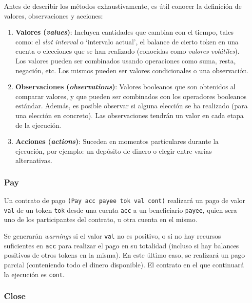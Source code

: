 \documentclass[12pt]{book}
\begin{document}
Antes de describir los métodos exhaustivamente, es útil conocer la definición de valores, observaciones y acciones:

\begin{enumerate}
    \item \textbf{Valores (\textit{values})}: Incluyen cantidades que cambian con el tiempo, tales como: el \textit{slot interval} o `intervalo actual', el balance de cierto token en una cuenta o elecciones que se han realizado (conocidas como \textit{valores volátiles}). Los valores pueden ser combinados usando operaciones como suma, resta, negación, etc. Los mismos pueden ser valores condicionales o una observación.

	\item \textbf{Observaciones (\textit{observations})}: Valores booleanos que son obtenidos al comparar valores, y que pueden ser combinados con los operadores booleanos estándar. Además, es posible observar si alguna elección se ha realizado (para una elección en concreto). Las observaciones tendrán un valor en cada etapa de la ejecución.

	\item \textbf{Acciones (\textit{actions})}: Suceden en momentos particulares durante la ejecución, por ejemplo: un depósito de dinero o elegir entre varias alternativas.
\end{enumerate}


\subsubsection{Pay}
Un contrato de pago \texttt{(Pay acc payee tok val cont)} realizará un pago de valor \texttt{val} de un token \texttt{tok} desde una cuenta \texttt{acc} a un beneficiario \texttt{payee}, quien sera uno de los participantes del contrato, u otra cuenta en el mismo.

Se generarán \textit{warnings} si el valor \texttt{val} no es positivo, o si no hay recursos suficientes en \texttt{acc} para realizar el pago en su totalidad (incluso si hay balances positivos de otros tokens en la misma). En este último caso, se realizará un pago parcial (conteniendo todo el dinero disponible). El contrato en el que continuará la ejecución es \texttt{cont}.

\subsubsection{Close}\label{sec:Close}
\end{document}
